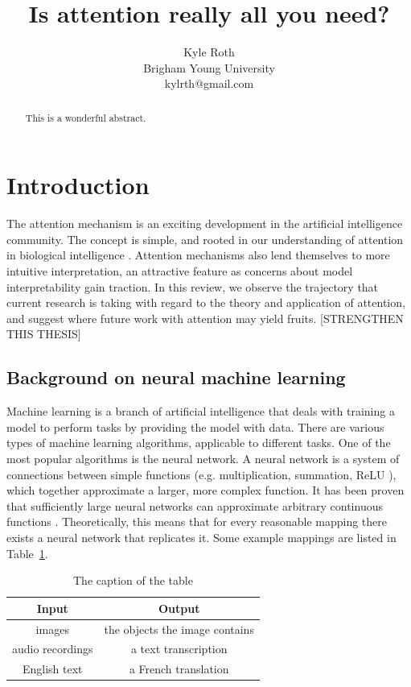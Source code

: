 \documentclass{article}
\title{Is attention really all you need?}
\author{
Kyle Roth\\
\affiliations
Brigham Young University\\
\emails
kylrth@gmail.com
}
\begin{document}
\maketitle

\tableofcontents

\vspace{30px}

\begin{abstract}
This is a wonderful abstract.
\end{abstract}

\section{Introduction}

The attention mechanism is an exciting development in the artificial intelligence community. The concept is simple, and rooted in our understanding of attention in biological intelligence \cite{glimpses,neuroscience-inspired}. Attention mechanisms also lend themselves to more intuitive interpretation, an attractive feature as concerns about model interpretability gain traction. In this review, we observe the trajectory that current research is taking with regard to the theory and application of attention, and suggest where future work with attention may yield fruits. [STRENGTHEN THIS THESIS]

\subsection{Background on neural machine learning}

Machine learning is a branch of artificial intelligence that deals with training a model to perform tasks by providing the model with data. There are various types of machine learning algorithms, applicable to different tasks. One of the most popular algorithms is the neural network. A neural network is a system of connections between simple functions (e.g. multiplication, summation, ReLU \cite{relu}), which together approximate a larger, more complex function. It has been proven that sufficiently large neural networks can approximate arbitrary continuous functions \cite{universal_approximators}. Theoretically, this means that for every reasonable mapping there exists a neural network that replicates it. Some example mappings are listed in Table~\ref{table:mappings}.

\begin{table}
    \centering
    \begin{tabular}{|c|c|}
        \hline
        \textbf{Input} & \textbf{Output} \\
        \hline
        images & the objects the image contains \\
        \hline
        audio recordings & a text transcription \\
        \hline
        English text & a French translation \\
        \hline
    \end{tabular}
    \caption{The caption of the table}\label{table:mappings}
\end{table}
\end{document}
